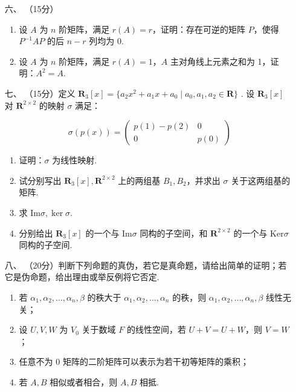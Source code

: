 \begin{enumerate}
	\item[六、]（15分）
      \begin{enumerate}[label=(\arabic*)]
        \item 设 $A$ 为 $n$ 阶矩阵，满足 $r(A)=r$，证明：存在可逆的矩阵 $P$，使得 $P^{-1}AP$ 的后 $n-r$ 列均为 0.
        \item 设 $A$ 为 $n$ 阶矩阵，满足 $r(A)=1$，$A$ 主对角线上元素之和为 1，证明：$A^2=A$.
      \end{enumerate}

	\item[七、]（15分）定义 $\mathbf R_3[x]=\{a_2x^2+a_1x+a_0\mid a_0,a_1,a_2\in \mathbf R\}$ . 设 $\mathbf R_3[x]$ 对 $\mathbf R^{2\times 2}$ 的映射 $\sigma$ 满足：

	\[\sigma(p(x))=\begin{pmatrix}
	    p(1)-p(2)&0\\
	    0 & p(0)\end{pmatrix}\]

        \begin{enumerate}[label=(\arabic*)]
            \item 证明：$\sigma$ 为线性映射.
            \item 试分别写出 $\mathbf R_3[x],\mathbf R^{2\times 2}$ 上的两组基 $B_1,B_2$，并求出 $\sigma$ 关于这两组基的矩阵.
            \item 求 $\text{Im}\sigma,\ker\sigma$.
            \item 分别给出 $\mathbf R_3[x]$ 的一个与 $\text{Im}\sigma$ 同构的子空间，和 $\mathbf R^{2\times 2}$ 的一个与 $\text{Ker}\sigma$ 同构的子空间.
        \end{enumerate}

	\item[八、]（20分）判断下列命题的真伪，若它是真命题，请给出简单的证明；若它是伪命题，给出理由或举反例将它否定.
    \begin{enumerate}[label=(\arabic*)]
        \item 若 $\alpha_1,\alpha_2,\dots,\alpha_n,\beta$ 的秩大于 $\alpha_1,\alpha_2,\dots,\alpha_n$ 的秩，则 $\alpha_1,\alpha_2,\dots,\alpha_n,\beta$ 线性无关；
        \item 设 $U,V,W$ 为 $V_0$ 关于数域 $F$ 的线性空间，若 $U+V=U+W$，则 $V=W$；
        \item 任意不为 0 矩阵的二阶矩阵可以表示为若干初等矩阵的乘积；
        \item 若 $A,B$ 相似或者相合，则 $A,B$ 相抵.
    \end{enumerate}
\end{enumerate}

\clearpage
